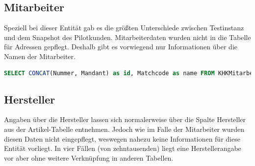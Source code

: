 \subsection{Mitarbeiter}
Speziell bei dieser Entität gab es die größten Unterschiede zwischen Testinstanz und dem Snapshot des Pilotkunden. Mitarbeiterdaten wurden nicht in die Tabelle für Adressen gepflegt. Deshalb gibt es vorwiegend nur Informationen über die Namen der Mitarbeiter.
\begin{lstlisting}[language=SQL,caption=Mitarbeiter SQL Query]
SELECT CONCAT(Nummer, Mandant) as id, Matchcode as name FROM KHKMitarbeiter
\end{lstlisting}

\subsection{Hersteller}
Angaben über die Hersteller lassen sich normalerweise über die Spalte Hersteller aus der Artikel-Tabelle entnehmen. Jedoch wie im Falle der Mitarbeiter wurden diesen Daten nicht eingepflegt, weswegen nahezu keine Informationen für diese Entität vorliegt. In vier Fällen (von zehntausenden) liegt eine Herstellerangabe vor aber ohne weitere Verknüpfung in anderen Tabellen.